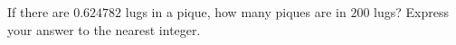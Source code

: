 If there are $0.624782$ lugs in a pique, how many piques are in $200$ lugs? Express your answer to the nearest integer.
